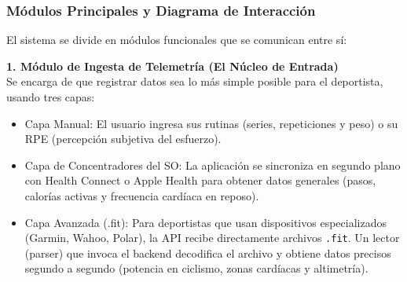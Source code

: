 \subsubsection{Módulos Principales y Diagrama de Interacción}
El sistema se divide en módulos funcionales que se comunican entre sí:

\textbf{1. Módulo de Ingesta de Telemetría (El Núcleo de Entrada)}\\
Se encarga de que registrar datos sea lo más simple posible para el deportista, usando tres capas:
\begin{itemize}
    \item Capa Manual: El usuario ingresa sus rutinas (series, repeticiones y peso) o su RPE (percepción subjetiva del esfuerzo).
    \item Capa de Concentradores del SO: La aplicación se sincroniza en segundo plano con Health Connect o Apple Health para obtener datos generales (pasos, calorías activas y frecuencia cardíaca en reposo).
    \item Capa Avanzada (.fit): Para deportistas que usan dispositivos especializados (Garmin, Wahoo, Polar), la API recibe directamente archivos \texttt{.fit}. Un lector (parser) que invoca el backend decodifica el archivo y obtiene datos precisos segundo a segundo (potencia en ciclismo, zonas cardíacas y altimetría).
\end{itemize}

